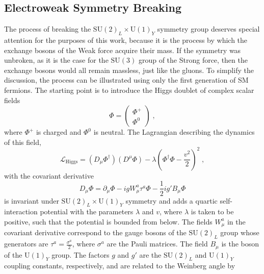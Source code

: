 \subsection{Electroweak Symmetry Breaking}
The process of breaking the $\mathrm{SU}(2)_L \times \mathrm{U}(1)_Y$ symmetry group deserves special attention for the purposes of this work, because it is the process by which the exchange bosons of the Weak force acquire their mass.
If the symmetry was unbroken, as it is the case for the $\mathrm{SU(3)}$ group of the Strong force, then the exchange bosons would all remain massless, just like the gluons.
To simplify the discussion, the process can be illustrated using only the first generation of SM fermions.
The starting point is to introduce the Higgs doublet of complex scalar fields
\begin{equation}
    \Phi = \begin{pmatrix}
        \Phi^+ \\
        \Phi^0
    \end{pmatrix}\;,\label{eq:higgs-doublet}
\end{equation}
where $\Phi^+$ is charged and $\Phi^0$ is neutral.
The Lagrangian describing the dynamics of this field,
\begin{equation}
    \mathcal{L}_\mathrm{Higgs} = (D_\mu \Phi^\dag)(D^\mu \Phi) - \lambda \left( \Phi^\dag \Phi - \frac{v^2}{2} \right)^2\;,\label{eq:higgs-lagrangian}
\end{equation}
with the covariant derivative
\begin{equation}
    D_\mu \Phi= \partial_\mu \Phi - ig W_\mu^a \tau^a \Phi - \frac{1}{2}ig'B_\mu \Phi
\end{equation}
is invariant under $\mathrm{SU}(2)_L \times \mathrm{U}(1)_Y$ symmetry and adds a quartic self-interaction potential with the parameters $\lambda$ and $v$, where $\lambda$ is taken to be positive, such that the potential is bounded from below.
The fields $W_\mu^a$ in the covariant derivative correspond to the gauge bosons of the $\mathrm{SU}(2)_L$ group whose generators are $\tau^a = \frac{\sigma^a}{2}$, where $\sigma^a$ are the Pauli matrices.
The field $B_\mu$ is the boson of the $\mathrm{U}(1)_Y$ group.
The factors $g$ and $g'$ are the $\mathrm{SU}(2)_L$ and $\mathrm{U}(1)_Y$ coupling constants, respectively, and are related to the Weinberg angle by
